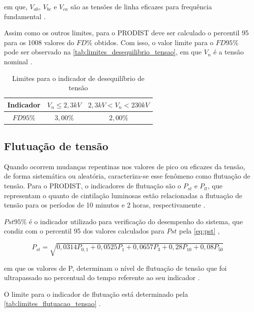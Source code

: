\noindent
em que, $V_{ab}$, $V_{bc}$ e $V_{ca}$ são as tensões de linha eficazes para frequência fundamental \cite{ref:ANEEL2021}.

Assim como os outros limites, para o PRODIST deve ser calculado o percentil 95 para os 1008 valores do $FD\%$ obtidos. Com isso, o valor limite para o $FD95\%$ pode ser observado na \autoref{tab:limites_desequilibrio_tensao}, em que $V_n$ é a tensão nominal \cite{ref:ANEEL2021}.

\begin{table}[H]
  \centering
  \caption{Limites para o indicador de desequilíbrio de tensão}
  \label{tab:limites_desequilibrio_tensao}
  \begin{tabular}{@{}ccc@{}}
  \toprule
  \textbf{Indicador} & \textbf{$V_n \leq  2,3 kV$} & \textbf{$2,3 kV < V_n  < 230 kV$} \\ \midrule
  $FD95\%$ & $3,00\%$ & $2,00\%$ \\ \bottomrule
  \end{tabular}
\end{table}

\subsection{Flutuação de tensão}

Quando ocorrem mudanças repentinas nos valores de pico ou eficazes da tensão, de forma sistemática ou aleatória, caracteriza-se esse fenômeno como flutuação de tensão. Para o PRODIST, o indicadores de flutuação são o $P_{st}$ e $P_{lt}$, que representam o quanto de cintilação luminosas estão relacionadas a flutuação de tensão para os períodos de 10 minutos e 2 horas, respectivamente \cite{ref:ANEEL2021}.

$P{st}95\%$ é o indicador utilizado para verificação do desempenho do sistema, que condiz com o percentil 95 dos valores calculados para $P{st}$ pela \autoref{eq:pst} \cite{ref:ANEEL2021},

\begin{equation}
P_{st}=\sqrt{0,0314 P_{0,1}+0,0525 P_1+0,0657 P_3+0,28 P_{10}+0,08 P_{50}}
\label{eq:pst}
\end{equation}

\noindent
em que os valores de P, determinam o nível de flutuação de tensão que foi ultrapassado no percentual do tempo referente ao seu indicador \cite{ref:ANEEL2021}.

O limite para o indicador de flutuação está determinado pela \autoref{tab:limites_flutuacao_tensao} \cite{ref:ANEEL2021}.

